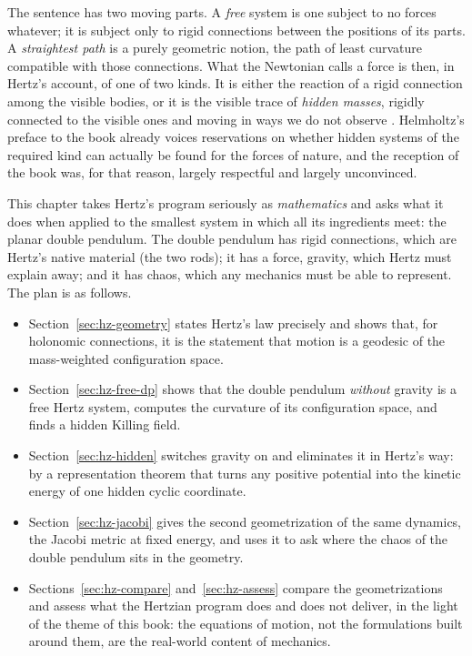 The sentence has two moving parts. A \emph{free} system is one subject to
no forces whatever; it is subject only to rigid connections between the
positions of its parts. A \emph{straightest path} is a purely geometric
notion, the path of least curvature compatible with those connections. What
the Newtonian calls a force is then, in Hertz's account, of one of two
kinds. It is either the reaction of a rigid connection among the visible
bodies, or it is the visible trace of \emph{hidden masses}, rigidly
connected to the visible ones and moving in ways we do not observe
\cite{hdp:hertz1894,hdp:lutzen2005}. Helmholtz's preface to the book already
voices reservations on whether hidden systems of the required kind can
actually be found for the forces of nature, and the reception of the
book was, for that reason, largely respectful and largely unconvinced.

This chapter takes Hertz's program seriously as \emph{mathematics} and
asks what it does when applied to the smallest system in which all its
ingredients meet: the planar double pendulum. The double pendulum has
rigid connections, which are Hertz's native material (the two rods); it has
a force, gravity, which Hertz must explain away; and it has chaos, which
any mechanics must be able to represent. The plan is as follows.

\begin{itemize}[nosep]
  \item Section~\ref{sec:hz-geometry} states Hertz's law precisely and shows
        that, for holonomic connections, it is the statement that motion is
        a geodesic of the mass-weighted configuration space.
  \item Section~\ref{sec:hz-free-dp} shows that the double pendulum
        \emph{without} gravity is a free Hertz system, computes the
        curvature of its configuration space, and finds a hidden Killing
        field.
  \item Section~\ref{sec:hz-hidden} switches gravity on and eliminates it in
        Hertz's way: by a representation theorem that turns any positive
        potential into the kinetic energy of one hidden cyclic coordinate.
  \item Section~\ref{sec:hz-jacobi} gives the second geometrization of the
        same dynamics, the Jacobi metric at fixed energy, and uses it to ask
        where the chaos of the double pendulum sits in the geometry.
  \item Sections~\ref{sec:hz-compare} and~\ref{sec:hz-assess} compare the
        geometrizations and assess what the Hertzian program does and does
        not deliver, in the light of the theme of this book: the equations of
        motion, not the formulations built around them, are the real-world
        content of mechanics.
\end{itemize}

